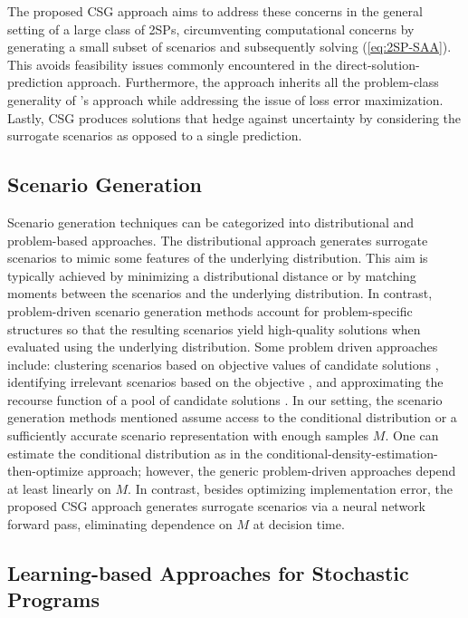 The proposed CSG approach aims to address these concerns in the general setting of a large class of 2SPs, circumventing computational concerns by generating a small subset of scenarios and subsequently solving (\ref{eq:2SP-SAA}). This avoids feasibility issues commonly encountered in the direct-solution-prediction approach. Furthermore, the approach inherits all the problem-class generality of \citet{zharmagambetov2023landscape}'s approach while addressing the issue of loss error maximization. Lastly, CSG produces solutions that hedge against uncertainty by considering the surrogate scenarios as opposed to a single prediction.


\subsection{Scenario Generation}

Scenario generation techniques can be categorized into distributional and problem-based approaches. The distributional approach generates surrogate scenarios to mimic some features of the underlying distribution. This aim is typically achieved by minimizing a distributional distance \citep{dupavcova2003scenario} or by matching moments \citep{hoyland2003heuristic} between the scenarios and the underlying distribution. In contrast, problem-driven scenario generation methods account for problem-specific structures so that the resulting scenarios yield high-quality solutions when evaluated using the underlying distribution. Some problem driven approaches include: clustering scenarios based on objective values of candidate solutions \citep{bertsimas2023optimization}, identifying irrelevant scenarios based on the objective \citep{fairbrother2022tail}, and approximating the recourse function of a pool of candidate solutions \citep{narum2024problem}. In our setting, the scenario generation methods mentioned assume access to the conditional distribution or a sufficiently accurate scenario representation with enough samples $M$. One can estimate the conditional distribution as in the conditional-density-estimation-then-optimize approach; however, the generic problem-driven approaches depend at least linearly on $M$. In contrast, besides optimizing implementation error, the proposed CSG approach generates surrogate scenarios via a neural network forward pass, eliminating dependence on $M$ at decision time.




\subsection{Learning-based Approaches for Stochastic Programs}

